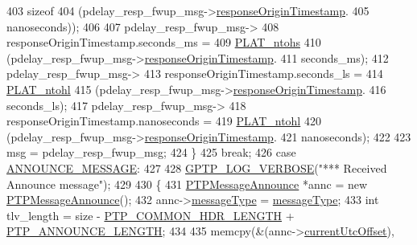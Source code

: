\begin{DoxyCode}
{{{{{{{{403                    \textcolor{keyword}{sizeof}
404                    (pdelay\_resp\_fwup\_msg->\hyperlink{class_p_t_p_message_path_delay_resp_follow_up_ace95ddb3f03eb3b4fcf8f73281dc0ee3}{responseOriginTimestamp}.
405                 nanoseconds));
406 
407             pdelay\_resp\_fwup\_msg->
408                 responseOriginTimestamp.seconds\_ms =
409                 \hyperlink{linux_2src_2platform_8cpp_a6b8f3e7b87b66fa774a07ddc67f883a7}{PLAT\_ntohs}
410                 (pdelay\_resp\_fwup\_msg->\hyperlink{class_p_t_p_message_path_delay_resp_follow_up_ace95ddb3f03eb3b4fcf8f73281dc0ee3}{responseOriginTimestamp}.
411                  seconds\_ms);
412             pdelay\_resp\_fwup\_msg->
413                 responseOriginTimestamp.seconds\_ls =
414                 \hyperlink{linux_2src_2platform_8cpp_ad335681c3444e0406899693a6f782173}{PLAT\_ntohl}
415                 (pdelay\_resp\_fwup\_msg->\hyperlink{class_p_t_p_message_path_delay_resp_follow_up_ace95ddb3f03eb3b4fcf8f73281dc0ee3}{responseOriginTimestamp}.
416                  seconds\_ls);
417             pdelay\_resp\_fwup\_msg->
418                 responseOriginTimestamp.nanoseconds =
419                 \hyperlink{linux_2src_2platform_8cpp_ad335681c3444e0406899693a6f782173}{PLAT\_ntohl}
420                 (pdelay\_resp\_fwup\_msg->\hyperlink{class_p_t_p_message_path_delay_resp_follow_up_ace95ddb3f03eb3b4fcf8f73281dc0ee3}{responseOriginTimestamp}.
421                  nanoseconds);
422 
423             msg = pdelay\_resp\_fwup\_msg;
424         \}
425         \textcolor{keywordflow}{break};
426     \textcolor{keywordflow}{case} \hyperlink{avbts__message_8hpp_ac6606ebe91c8ac66a2c314c79f5ab013a4c8d615c4de8a7fc2ea24b5eff2811ef}{ANNOUNCE\_MESSAGE}:
427 
428         \hyperlink{gptp__log_8hpp_add03384a2a8099b27e07d041cce77e6f}{GPTP\_LOG\_VERBOSE}(\textcolor{stringliteral}{"*** Received Announce message"});
429 
430         \{
431             \hyperlink{class_p_t_p_message_announce}{PTPMessageAnnounce} *annc = \textcolor{keyword}{new} \hyperlink{class_p_t_p_message_announce}{PTPMessageAnnounce}();
432             annc->\hyperlink{class_p_t_p_message_common_adb32627aa5b0e2dbad3ccd88aab07c05}{messageType} = \hyperlink{class_p_t_p_message_common_adb32627aa5b0e2dbad3ccd88aab07c05}{messageType};
433             \textcolor{keywordtype}{int} tlv\_length = size - \hyperlink{avbts__message_8hpp_a8ec4d965b7b1e83844f1c17f12e9b8e4}{PTP\_COMMON\_HDR\_LENGTH} + 
      \hyperlink{avbts__message_8hpp_ad800b5cd5359d021054af8e902100ba7}{PTP\_ANNOUNCE\_LENGTH};
434 
435             memcpy(&(annc->\hyperlink{class_p_t_p_message_announce_a4ee8eca04b1ccd7d8eaae5f0dd3a11fa}{currentUtcOffset}),
}}}}}}}}
\end{DoxyCode}
